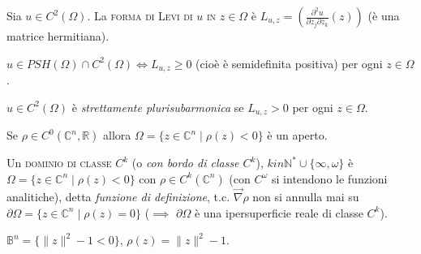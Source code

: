 \begin{defn}
  Sia $u \in C^2(\Omega)$. La \textsc{forma di Levi di $u$ in $z \in \Omega$} è $L_{u,z}=\left(\frac{\partial^2 u}{\partial z_j\partial\bar{z}_k}(z)\right)$ (è una matrice hermitiana).
\end{defn}

\begin{oss}
  $u \in PSH(\Omega) \cap C^2(\Omega) \iff L_{u,z} \ge 0$ (cioè è semidefinita positiva) per ogni $z \in \Omega$.
\end{oss}

\begin{defn}
  $u \in C^2(\Omega)$ è \textit{strettamente plurisubarmonica} se $L_{u,z}>0$ per ogni $z \in \Omega$.
\end{defn}

\begin{oss}
  Se $\rho \in C^0(\mathbb{C}^n,\mathbb{R})$ allora $\Omega=\{z \in \mathbb{C}^n \mid \rho(z)<0\}$ è un aperto.
\end{oss}

\begin{defn}
  Un \textsc{dominio di classe $C^k$} (o \textit{con bordo di classe $C^k$}), $k in \mathbb{N}^*\cup\{\infty, \omega\}$ è $\Omega=\{z \in \mathbb{C}^n \mid \rho(z)<0\}$ con $\rho \in C^k(\mathbb{C}^n)$ (con $C^{\omega}$ si intendono le funzioni analitiche), detta \textit{funzione di definizione},
  t.c. $\vec{\nabla}\rho$ non si annulla mai su $\partial\Omega=\{z \in \mathbb{C}^n \mid \rho(z)=0\}$ ($\implies$ $\partial\Omega$ è una ipersuperficie reale di classe $C^k$).
\end{defn}

\begin{ex}
  $\mathbb{B}^n=\{\|z\|^2-1<0\}$, $\rho(z)=\|z\|^2-1$.
\end{ex}
